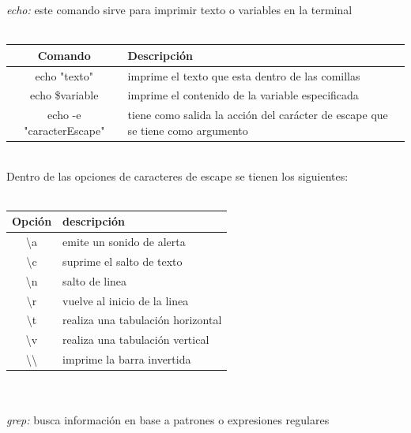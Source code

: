 \documentclass[10pt,a4paper,titlepage]{article}
\begin{document}
	\emph{echo:} este comando sirve para imprimir texto o variables en la terminal
	\\
	\\
	\begin{tabular}{|c|p{8cm}|}
		\hline
		Comando & Descripción \\
		\hline
		echo "texto" & imprime el texto que esta dentro de las comillas \\
		\hline
		echo \$variable & imprime el contenido de la variable especificada \\
		\hline
		echo -e "caracterEscape" & tiene como salida la acción del carácter de escape que se tiene como argumento \\
		\hline
	\end{tabular}
	\\
	Dentro de las opciones de caracteres de escape se tienen los siguientes:
	\\
	\\
	\begin{tabular}{|c|p{8cm}|}
		\hline
		Opción & descripción \\
		\hline
		\textbackslash a & emite un sonido de alerta \\
		\hline
		\textbackslash c & suprime el salto de texto \\
		\hline
		\textbackslash n & salto de linea \\
		\hline
		\textbackslash r & vuelve al inicio de la linea \\
		\hline
		\textbackslash t & realiza una tabulación horizontal \\
		\hline
		\textbackslash v & realiza una tabulación vertical \\
		\hline
		\textbackslash \textbackslash & imprime la barra invertida \\
		\hline
	\end{tabular}
	\\
	\\
	\emph{grep:} busca información en base a patrones o expresiones regulares
	\\
	\\
\end{document}

